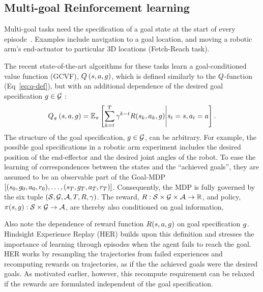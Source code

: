 \subsection{Multi-goal Reinforcement learning}
Multi-goal tasks need the specification of a goal state at the start of
every episode~\citep{plappert2018multi}. Examples include navigation to a
goal location, and moving a robotic arm's end-actuator to particular 3D
locations (Fetch-Reach task).

The recent state-of-the-art algorithms for these tasks learn a goal-conditioned value
function (GCVF), $Q_{}^{}\left({s}, {a}, {g}\right)$, which is defined
similarly to the
$Q$-function (Eq~\ref{eq:q-def}), but with an additional dependence of
the desired goal specification $g \in \mathcal{G}$ :
%
\begin{align}
Q_{\pi}^{}\left({s}, {a}, {g}\right) = \mathbb{E}_\pi\left[ \sum_{k=t}^T
  \gamma^{k-t} R(s_k, a_k, g)
  \middle| s_t = s, a_t = a \right] .
  \label{eq:q-def}
\end{align}%
%
The structure of the goal specification, $g \in \mathcal{G}$, can be
arbitrary. For example, the possible goal specifications in a robotic
arm experiment includes
the desired position of the end-effector and the desired joint
angles of the robot.  To ease the learning of correspondences between the states and
the ``achieved goals'', they are assumed to be an observable part of the
Goal-MDP $[(s_0, g_0, a_0, r_0), \dots, (s_T,
g_T, a_T, r_T)]$. Consequently, the MDP is fully governed by
the six tuple $(\mathcal{S}, \mathcal{G}, \mathcal{A}, T, R, \gamma)$. The
reward, $R : \mathcal{S} \times \mathcal{G} \times \mathcal{A}  \rightarrow \mathbb{R} $, and policy,
$\pi(s, g): \mathcal{S} \times \mathcal{G} \rightarrow \mathcal{A} $, are thereby also conditioned on goal information,  

Also note the dependence of reward function $R(s, a, g)$ on goal
specification $g$. Hindsight Experience Replay (HER) builds upon this definition
and stresses the importance of learning through episodes when the agent fails to
reach the goal. HER works by resampling the trajectories from failed
experiences and recomputing rewards on trajectories, as if the the achieved
goals were the desired goals. As motivated earlier, however, this recompute
requirement can be relaxed if the rewards are formulated independent of the goal
specification.


